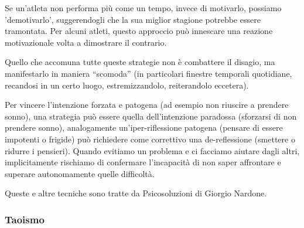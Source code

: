 \documentclass[12pt]{book} %
\begin{document}
\begin{mdframed}[linewidth=1pt]
Se un'atleta non performa più come un tempo, invece di motivarlo, possiamo 'demotivarlo', suggerendogli che la sua miglior stagione potrebbe essere tramontata. Per alcuni atleti, questo approccio può innescare una reazione motivazionale volta a dimostrare il contrario.

Quello che accomuna tutte queste strategie non è combattere il disagio, ma manifestarlo in maniera “scomoda” (in particolari finestre temporali quotidiane, recandosi in un certo luogo, estremizzandolo, reiterandolo eccetera).

Per vincere l'intenzione forzata e patogena (ad esempio non riuscire a prendere sonno), una strategia può essere quella dell'intenzione paradossa (sforzarsi di non prendere sonno), analogamente un'iper-riflessione patogena (pensare di essere impotenti o frigide) può richiedere come correttivo una de-reflessione (smettere o ridurre i pensieri). Quando evitiamo un problema e ci facciamo aiutare dagli altri, implicitamente rischiamo di confermare l'incapacità di non saper affrontare e superare autonomamente quelle difficoltà.

Queste e altre tecniche sono tratte da Psicosoluzioni di Giorgio Nardone. 
\end{mdframed}

\subsubsection{Taoismo}
\end{document}
